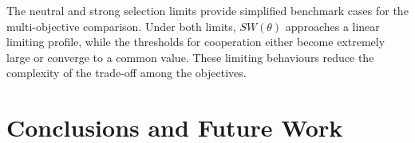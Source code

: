 \documentclass{article}
\begin{document}
The neutral and strong selection limits provide simplified benchmark cases for the multi-objective comparison. Under both limits, $SW(\theta)$ approaches a linear limiting profile, while the thresholds for cooperation either become extremely large or converge to a common value. These limiting behaviours reduce the complexity of the trade-off among the objectives. %



\section{Conclusions and Future Work}
\label{sec: summary}
\end{document}
